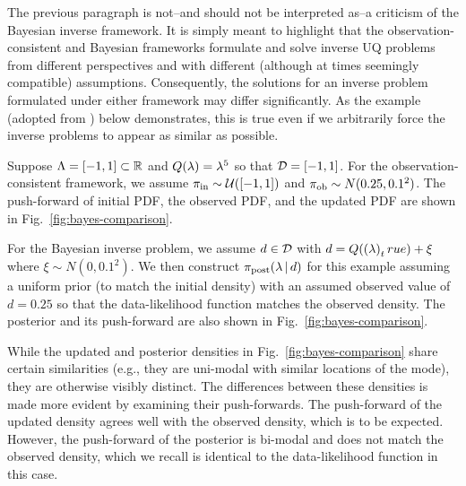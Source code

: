 The previous paragraph is not\---and should not be interpreted as\---a criticism of the Bayesian inverse framework.
It is simply meant to highlight that the observation-consistent and Bayesian frameworks formulate and solve inverse UQ problems from different perspectives and with different (although at times seemingly compatible) assumptions.
Consequently, the solutions for an inverse problem formulated under either framework may differ significantly.
As the example (adopted from \cite{BJW18a}) below demonstrates, this is true even if we arbitrarily force the inverse problems to appear as similar as possible.


Suppose ${\Lambda} = [-1,1]\subset\mathbb{R}$ and $Q(\lambda)=\lambda^5$ so that $\mathcal{D} = [-1,1]$.
For the observation-consistent framework, we assume $\operatorname*{\pi_{in}}\sim \mathcal{U}([-1,1])$ and $\operatorname*{\pi_{ob}}\sim N(0.25,0.1^2)$.
The push-forward of initial PDF, the observed PDF, and the updated PDF are shown in Fig.~\ref{fig:bayes-comparison}.

For the Bayesian inverse problem, we assume $d\in \mathcal{D}$ with $d=Q(\left ( \lambda \right )_true)+\xi$ where $\xi\sim N(0,0.1^2)$.
We then construct $\pi_{\text{post}}(\lambda \, |\, d)$ for this example assuming a uniform prior (to match the initial density) with an assumed observed value of $d=0.25$ so that the data-likelihood function matches the observed density.
The posterior and its push-forward are also shown in Fig.~\ref{fig:bayes-comparison}.

While the updated and posterior densities in Fig.~\ref{fig:bayes-comparison} share certain similarities (e.g., they are uni-modal with similar locations of the mode), they are otherwise visibly distinct.
The differences between these densities is made more evident by examining their push-forwards.
The push-forward of the updated density agrees well with the observed density, which is to be expected.
However, the push-forward of the posterior is bi-modal and does not match the observed density, which we recall is identical to the data-likelihood function in this case.

